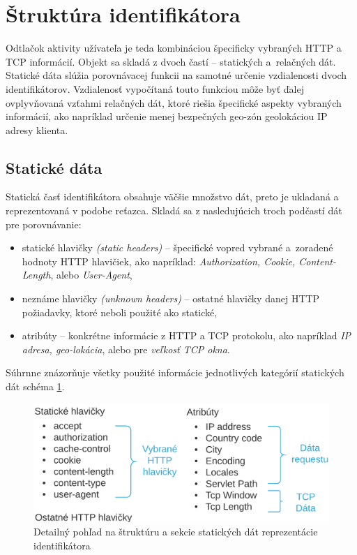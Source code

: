 \documentclass[
  printed, %
  table,   %
  lof,     %
  nolot,   %
  nocover
]{fithesis3}
\begin{document}
\section{Štruktúra identifikátora}
\label{s:footprint-structure}
Odtlačok aktivity užívateľa je teda kombináciou špecificky vybraných HTTP a TCP informácií.
Objekt sa skladá z dvoch častí -- statických a~relačných dát. Statické
dáta slúžia porovnávacej funkcii na samotné
určenie vzdialenosti dvoch identifikátorov. Vzdialenosť vypočítaná touto
funkciou môže byť ďalej ovplyvňovaná vzťahmi relačných dát, ktoré riešia
špecifické aspekty vybraných informácií, ako napríklad určenie menej bezpečných
geo-zón geolokáciou IP adresy klienta.

\subsection{Statické dáta}
Statická časť identifikátora obsahuje väčšie množstvo dát, preto je
ukladaná a reprezentovaná v podobe reťazca. Skladá sa z nasledujúcich troch podčastí dát pre porovnávanie:
\begin{itemize}
    \item statické hlavičky \textit{(static headers)} -- špecifické vopred
    vybrané a~zoradené hodnoty HTTP hlavičiek, ako napríklad: \textit{Authorization, Cookie, Content-Length}, alebo
    \textit{User-Agent},
    \item neznáme hlavičky \textit{(unknown headers)} -- ostatné hlavičky danej
    HTTP požiadavky, ktoré neboli použité ako statické,
    \item atribúty -- konkrétne informácie z HTTP a TCP protokolu, ako napríklad
    \textit{IP adresa, geo-lokácia}, alebo pre \textit{veľkosť TCP okna}.
\end{itemize}
Súhrnne znázorňuje všetky použité informácie jednotlivých kategórií statických dát schéma
\ref{fig:footprint-data-static}.

\begin{figure}[t]
  \centering
    \includegraphics[width=.97\textwidth]{images/footprint-data-static.png}
  \caption{Detailný pohľad na štruktúru a sekcie statických dát reprezentácie identifikátora}
  \label{fig:footprint-data-static}
\end{figure}
\end{document}
